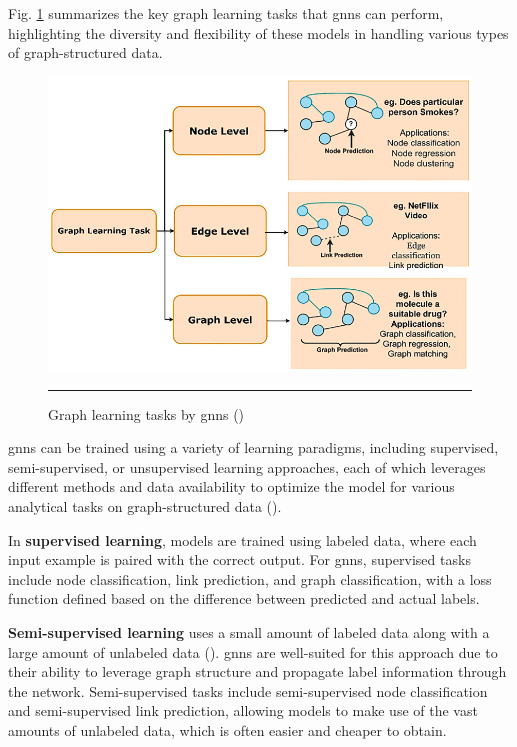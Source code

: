 Fig. \ref{fig:gnn-graph-learning-tasks-summary} summarizes the key graph learning tasks that \glspl{gnn} can perform, highlighting the diversity and flexibility of these models in handling various types of graph-structured data.

\begin{figure}[htbp]
    \centering
 \includegraphics[width=.9\textwidth]{03_Figures/literature-review/gnn-graph-learning-tasks-summary.png}
     \rule{35em}{0.5pt}
    \caption{Graph learning tasks by \glspl{gnn} (\cite{Khemani2024})} 
 \label{fig:gnn-graph-learning-tasks-summary}
\end{figure}

\glspl{gnn} can be trained using a variety of learning paradigms, including supervised, semi-supervised, or unsupervised learning approaches, each of which leverages different methods and data availability to optimize the model for various analytical tasks on graph-structured data (\cite{Zhou2020,Wu2021}).

In \textbf{supervised learning}, models are trained using labeled data, where each input example is paired with the correct output.
For \glspl{gnn}, supervised tasks include node classification, link prediction, and graph classification, with a loss function defined based on the difference between predicted and actual labels.

\textbf{Semi-supervised learning} uses a small amount of labeled data along with a large amount of unlabeled data (\cite{Kipf2017}).
\glspl{gnn} are well-suited for this approach due to their ability to leverage graph structure and propagate label information through the network.
Semi-supervised tasks include semi-supervised node classification and semi-supervised link prediction, allowing models to make use of the vast amounts of unlabeled data, which is often easier and cheaper to obtain.

